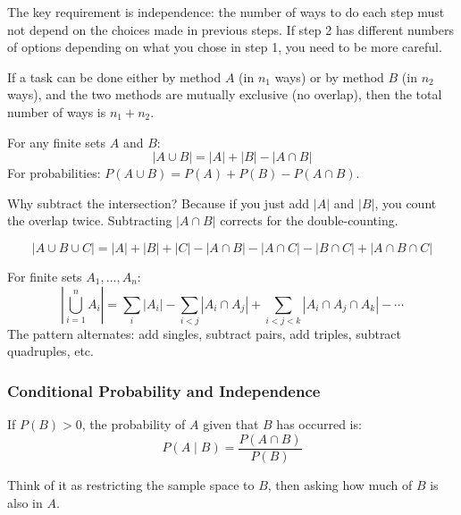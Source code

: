The key requirement is independence: the number of ways to do each step must not depend on the choices made in previous steps. If step 2 has different numbers of options depending on what you chose in step 1, you need to be more careful.

\begin{theorem}
If a task can be done either by method $A$ (in $n_1$ ways) or by method $B$ (in $n_2$ ways), and the two methods are mutually exclusive (no overlap), then the total number of ways is $n_1 + n_2$.
\end{theorem}

\begin{theorem}
For any finite sets $A$ and $B$:
\[
|A \cup B| = |A| + |B| - |A \cap B|
\]
For probabilities: $P(A \cup B) = P(A) + P(B) - P(A \cap B)$.
\end{theorem}

Why subtract the intersection? Because if you just add $|A|$ and $|B|$, you count the overlap twice. Subtracting $|A \cap B|$ corrects for the double-counting.

\begin{theorem}
\[
|A \cup B \cup C| = |A| + |B| + |C| - |A \cap B| - |A \cap C| - |B \cap C| + |A \cap B \cap C|
\]
\end{theorem}

\begin{theorem}
For finite sets $A_1, \ldots, A_n$:
\[
\left|\bigcup_{i=1}^{n} A_i\right| = \sum_{i} |A_i| - \sum_{i < j} |A_i \cap A_j| + \sum_{i < j < k} |A_i \cap A_j \cap A_k| - \cdots
\]
The pattern alternates: add singles, subtract pairs, add triples, subtract quadruples, etc.
\end{theorem}

\subsubsection*{Conditional Probability and Independence}

\begin{definition}
If $P(B) > 0$, the probability of $A$ given that $B$ has occurred is:
\[
P(A \mid B) = \frac{P(A \cap B)}{P(B)}
\]
\end{definition}

Think of it as restricting the sample space to $B$, then asking how much of $B$ is also in $A$.

